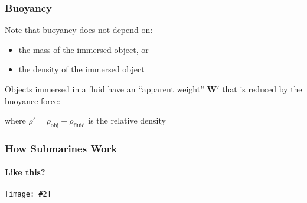 \documentclass[12pt,aspectratio=169]{beamer}
\newcommand{\pic}[2]{\texttt{[image: \#2]}}
\newcommand{\mb}[1]{\mathbf{#1}}
\newcommand{\eq}[2]{\vspace{#1}{\Large\begin{displaymath}#2\end{displaymath}}}
\begin{document}
\begin{frame}
  \frametitle{Buoyancy}
  Note that buoyancy does not depend on:
  \begin{itemize}
  \item the mass of the immersed object, or
  \item the density of the immersed object
  \end{itemize}
%
  \vspace{.15in}Objects immersed in a fluid have an ``apparent weight''
  $\mb{W}'$ that is reduced by the buoyance force:

  \eq{-.2in}{
    \mb{W}' = \mb{W}-\mb{B}=\rho'\mb{g}V
  }
  
  where $\rho'=\rho_{\textrm{obj}}-\rho_{\textrm{fluid}}$ is the relative density
\end{frame}



\begin{frame}
  \frametitle{How Submarines Work}
  \framesubtitle{Like this?}
  \begin{center}
    \pic{.7}{EbHMOXk.jpg}
  \end{center}
\end{frame}
\end{document}
